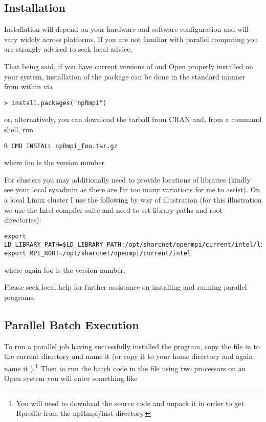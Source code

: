 \documentclass[nojss]{jss}
\begin{document}
\subsection*{Installation}

Installation will depend on your hardware and software configuration
and will vary widely across platforms. If you are not familiar with
parallel computing you are strongly advised to seek local advice.

That being said, if you have current versions of  and Open
 properly installed on your system, installation of the
 package can be done in the standard manner from within
 via
\begin{verbatim}
> install.packages("npRmpi")
\end{verbatim}
or, alternatively, you can download the  tarball from CRAN
and, from a command shell, run
\begin{verbatim}
R CMD INSTALL npRmpi_foo.tar.gz 
\end{verbatim}
where foo is the version number. 

For clusters you may additionally need to provide locations of
libraries (kindly see your local sysadmin as there are far too many
variations for me to assist). On a local Linux cluster I use the
following by way of illustration (for this illustration we use the
Intel compiler suite and need to set  library paths and
 root directories):
\begin{verbatim}
export LD_LIBRARY_PATH=$LD_LIBRARY_PATH:/opt/sharcnet/openmpi/current/intel/lib
export MPI_ROOT=/opt/sharcnet/openmpi/current/intel 
\end{verbatim}
where again foo is the version number. 

Please seek local help for further assistance on installing and
running parallel programs.

\subsection{Parallel Batch Execution}

To run a parallel  job having successfully installed the
 program, copy the  file in
 to the current directory and name it
 (or copy it to your home directory and again name it
).\footnote{You will need to download the 
  source code and unpack it in order to get Rprofile from the
  npRmpi/inst directory.} Then to run the batch code in the file
 using two processors on an Open 
system you will enter something like
\end{document}
